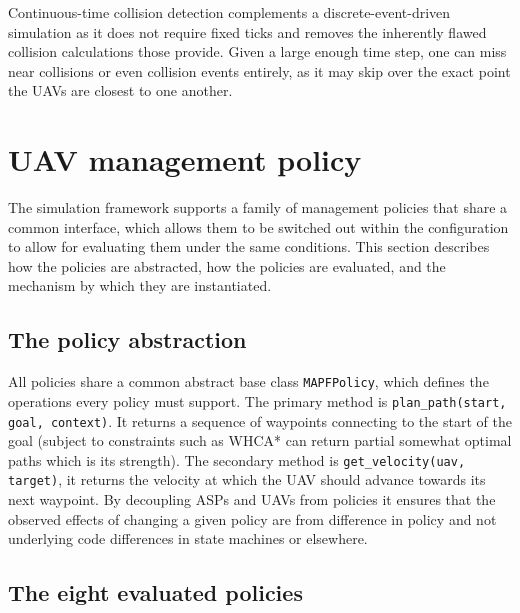 \vspace{1em}

Continuous-time collision detection complements a discrete-event-driven simulation as it does not require fixed ticks and removes the inherently flawed collision calculations those provide. Given a large enough time step, one can miss near collisions or even collision events entirely, as it may skip over the exact point the UAVs are closest to one another. \par

\vspace{1em}

\section{UAV management policy}

The simulation framework supports a family of management policies that share a common interface, which allows them to be switched out within the configuration to allow for evaluating them under the same conditions. This section describes how the policies are abstracted, how the policies are evaluated, and the mechanism by which they are instantiated. \par

\vspace{1em}

\subsection{The policy abstraction}

All policies share a common abstract base class \texttt{MAPFPolicy}, which defines the operations every policy must support. The primary method is \texttt{plan\_path(start, goal, context)}. It returns a sequence of waypoints connecting to the start of the goal (subject to constraints such as WHCA* can return partial somewhat optimal paths which is its strength). The secondary method is \texttt{get\_velocity(uav, target)}, it returns the velocity at which the UAV should advance towards its next waypoint. By decoupling ASPs and UAVs from policies it ensures that the observed effects of changing a given policy are from difference in policy and not underlying code differences in state machines or elsewhere. \par

\vspace{1em}

\subsection{The eight evaluated policies}

